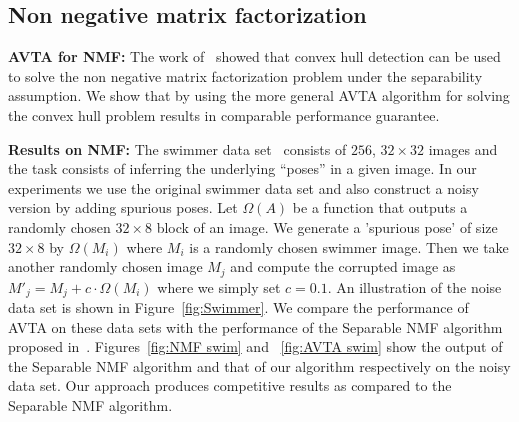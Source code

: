 \documentclass[]{article}
\begin{document}
	\newpage
	\subsection{Non negative matrix factorization}
	\noindent \textbf{AVTA for NMF:} The work of~\cite{arora2012computing} showed that convex hull detection can be used to solve the non negative matrix factorization problem under the separability assumption. We show that by using the more general AVTA algorithm for solving the convex hull problem results in comparable performance guarantee.
	
	\noindent \textbf{Results on NMF:} The swimmer data set~\cite{donoho2003does} consists of $256$, $32 \times 32$ images and the task consists of inferring the underlying ``poses'' in a given image. In our experiments we use the original swimmer data set and also construct a noisy version by adding spurious poses. Let $\Omega(A)$ be a function that outputs a randomly chosen $32 \times 8$ block of an image. We generate a  'spurious pose' of size  $32\times 8$ by $\Omega(M_i)$ where $M_i$ is a randomly chosen swimmer image. Then we take another randomly chosen image $M_j$ and compute the corrupted image as $M'_j= M_j + c \cdot \Omega(M_i)$ where we simply set $c=0.1$. An illustration of the noise data set is shown in Figure~\ref{fig:Swimmer}. We compare the performance of AVTA on these data sets with the performance of the Separable NMF algorithm proposed in~\cite{arora2012computing}. Figures~\ref{fig:NMF swim} and ~\ref{fig:AVTA swim} show the output of the Separable NMF algorithm and that of our algorithm respectively on the noisy data set. Our approach produces competitive results as compared to the Separable NMF algorithm.
	
\end{document}
